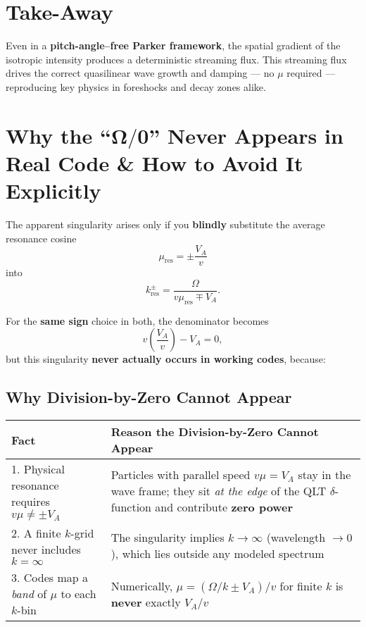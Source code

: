 \section*{Take-Away}

Even in a \textbf{pitch-angle–free Parker framework}, the spatial gradient of the isotropic intensity produces a deterministic streaming flux. This streaming flux drives the correct quasilinear wave growth and damping — no $\mu$ required — reproducing key physics in foreshocks and decay zones alike.

\section*{Why the ``$\boldsymbol{\Omega/0}$'' Never Appears in Real Code \& How to Avoid It Explicitly}

The apparent singularity arises only if you \textbf{blindly} substitute the average resonance cosine
\begin{equation}
\mu_{\text{res}} = \pm \frac{V_A}{v} \tag{1}
\end{equation}
into
\begin{equation}
k_{\text{res}}^{\pm} = \frac{\Omega}{v \mu_{\text{res}} \mp V_A}. \tag{2}
\end{equation}

For the \textbf{same sign} choice in both, the denominator becomes
\[
v \left(\frac{V_A}{v}\right) - V_A = 0,
\]
but this singularity \textbf{never actually occurs in working codes}, because:

\subsection*{Why Division-by-Zero Cannot Appear}

\renewcommand{\arraystretch}{1.3}
\begin{tabular}{p{5.5cm} p{9cm}}
\toprule
\textbf{Fact} & \textbf{Reason the Division-by-Zero Cannot Appear} \\
\midrule
1. Physical resonance requires $v\mu \neq \pm V_A$ &
Particles with parallel speed $v\mu = V_A$ stay in the wave frame; they sit \emph{at the edge} of the QLT $\delta$-function and contribute \textbf{zero power} \\
2. A finite $k$-grid never includes $k = \infty$ &
The singularity implies $k \rightarrow \infty$ (wavelength $\rightarrow 0$), which lies outside any modeled spectrum \\
3. Codes map a \textit{band} of $\mu$ to each $k$-bin &
Numerically, $\mu = (\Omega/k \pm V_A)/v$ for finite $k$ is \textbf{never} exactly $V_A/v$ \\
\bottomrule
\end{tabular}

